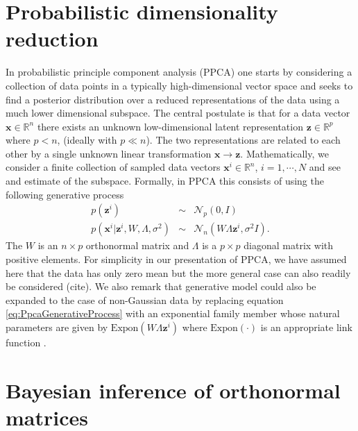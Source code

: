 \documentclass{article}
\newcommand{\mb}[1]{\mathbf{#1}}
\begin{document}
\section{Probabilistic dimensionality reduction} \label{Probabilistic dimensionality reduction}
In probabilistic principle component analysis (PPCA) one starts by considering a collection of data points in a typically high-dimensional vector space and seeks to find a posterior distribution over a reduced representations of the data using a much lower dimensional subspace.  The central postulate is that for a data vector $\mathbf{x} \in \mathbb{R}^n$ there exists an unknown low-dimensional latent representation $\mathbf{z} \in \mathbb{R}^p$ where $p < n$, (ideally with $p \ll n$).  The two representations are related to each other by a single unknown linear transformation $\mathbf{x} \rightarrow \mathbf{z}$.  Mathematically, we consider a finite collection of sampled data vectors $\mathbf{x}^i \in \mathbb{R}^n$, $i = 1, \cdots, N$ and see and estimate of the subspace.  Formally, in PPCA this consists of using the following generative process
\begin{eqnarray}
\label{eq:PpcaGenerativeProcess}
p(\mb{z}^i) &\sim& \mathcal{N}_p(0, I) \nonumber\\
p(\mb{x}^i | \mb{z}^i, W, \Lambda, \sigma^2) &\sim& \mathcal{N}_n(W \Lambda \mb{z}^i, \sigma^2 I).
\end{eqnarray}
The $W$ is an $n \times p$ orthonormal matrix and $\Lambda$ is a $p \times p$ diagonal matrix with positive elements.  For simplicity in our presentation of PPCA, we have assumed here that the data has only zero mean but the more general case can also readily be considered (cite).
We also remark that generative model could also be expanded to the case of non-Gaussian data by replacing equation \ref{eq:PpcaGenerativeProcess} with an exponential family member whose natural parameters are given by $\mathrm{Expon}(W\Lambda \mb{z}^i)$ where $\mathrm{Expon}(\cdot)$ is an appropriate link function \citep{mohamed2009bayesian}. 

\section{Bayesian inference of orthonormal matrices}\label{orthonormal}
\end{document}
